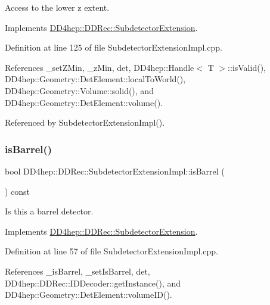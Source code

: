 Access to the lower z extent. 



Implements \hyperlink{class_d_d4hep_1_1_d_d_rec_1_1_subdetector_extension_a5229b92c90c65a76156b5ea082aa0301}{D\+D4hep\+::\+D\+D\+Rec\+::\+Subdetector\+Extension}.



Definition at line 125 of file Subdetector\+Extension\+Impl.\+cpp.



References \+\_\+set\+Z\+Min, \+\_\+z\+Min, det, D\+D4hep\+::\+Handle$<$ T $>$\+::is\+Valid(), D\+D4hep\+::\+Geometry\+::\+Det\+Element\+::local\+To\+World(), D\+D4hep\+::\+Geometry\+::\+Volume\+::solid(), and D\+D4hep\+::\+Geometry\+::\+Det\+Element\+::volume().



Referenced by Subdetector\+Extension\+Impl().

\hypertarget{class_d_d4hep_1_1_d_d_rec_1_1_subdetector_extension_impl_a1e89ba5b16e3697f85612cc7651cd56b}{}\label{class_d_d4hep_1_1_d_d_rec_1_1_subdetector_extension_impl_a1e89ba5b16e3697f85612cc7651cd56b} 
\subsubsection{\texorpdfstring{is\+Barrel()}{isBarrel()}}
{\footnotesize\ttfamily bool D\+D4hep\+::\+D\+D\+Rec\+::\+Subdetector\+Extension\+Impl\+::is\+Barrel (\begin{DoxyParamCaption}{ }\end{DoxyParamCaption}) const\hspace{0.3cm}{\ttfamily [virtual]}}



Is this a barrel detector. 



Implements \hyperlink{class_d_d4hep_1_1_d_d_rec_1_1_subdetector_extension_a12be99462aa14feba6df7eed02468994}{D\+D4hep\+::\+D\+D\+Rec\+::\+Subdetector\+Extension}.



Definition at line 57 of file Subdetector\+Extension\+Impl.\+cpp.



References \+\_\+is\+Barrel, \+\_\+set\+Is\+Barrel, det, D\+D4hep\+::\+D\+D\+Rec\+::\+I\+D\+Decoder\+::get\+Instance(), and D\+D4hep\+::\+Geometry\+::\+Det\+Element\+::volume\+I\+D().



